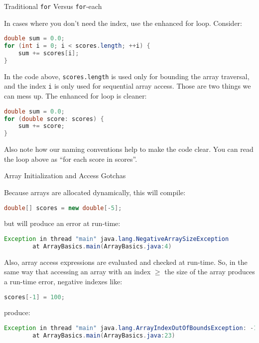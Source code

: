 \documentclass{beamer}
\begin{document}
\begin{frame}[fragile]{Traditional {\tt for} Versus {\tt for}-each}


In cases where you don't need the index, use the enhanced for loop.  Consider:
\vspace{-.05in}
\begin{lstlisting}[language=Java]
double sum = 0.0;
for (int i = 0; i < scores.length; ++i) {
    sum += scores[i];
} 
\end{lstlisting}
\vspace{-.05in}
In the code above, {\tt scores.length} is used only for bounding the array traversal, and the index {\tt i} is only used for sequential array access.  Those are two things we can mess up.  The enhanced for loop is cleaner:

\begin{lstlisting}[language=Java]
double sum = 0.0;
for (double score: scores) {
    sum += score;
} 
\end{lstlisting}

Also note how our naming conventions help to make the code clear.  You can read the loop above as ``for each score in scores''.

\end{frame}

\begin{frame}[fragile]{Array Initialization and Access Gotchas}


Because arrays are allocated dynamically, this will compile:
\begin{lstlisting}[language=Java]
double[] scores = new double[-5];
\end{lstlisting}
but will produce an error at run-time:
\begin{lstlisting}[language=Java]
Exception in thread "main" java.lang.NegativeArraySizeException
        at ArrayBasics.main(ArrayBasics.java:4)
\end{lstlisting}

Also, array access expressions are evaluated and checked at run-time.  So, in the same way that accessing an array with an index $\ge$ the size of the array produces a run-time error, negative indexes like:

\begin{lstlisting}[language=Java]
scores[-1] = 100;
\end{lstlisting}
produce:
\begin{lstlisting}[language=Java]
Exception in thread "main" java.lang.ArrayIndexOutOfBoundsException: -1
        at ArrayBasics.main(ArrayBasics.java:23)
\end{lstlisting}
\end{frame}
\end{document}
